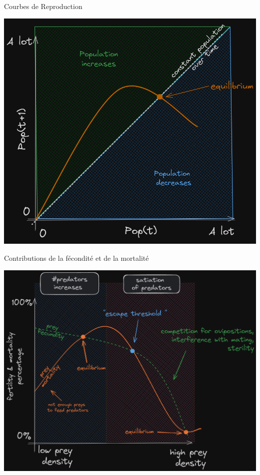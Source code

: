 \documentclass[11,aspectratio=1610]{beamer}
\begin{document}
\begin{frame}{Courbes de Reproduction}

\vfill
\centering
\includegraphics[height=0.8\textheight]{img/repro1.png}
\begin{footnotesize}
\end{footnotesize}

\end{frame}



\begin{frame}{Contributions de la fécondité et de la mortalité}

\vfill
\centering
\includegraphics[height=0.8\textheight]{img/repro2.png}
\begin{footnotesize}
\end{footnotesize}

\end{frame}
\end{document}
